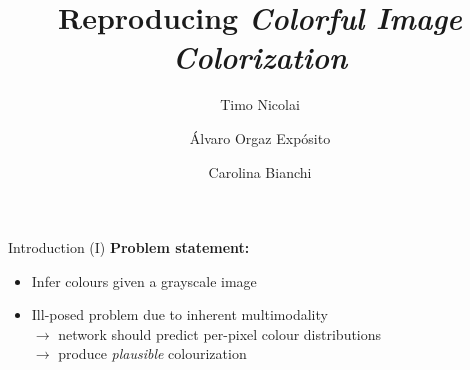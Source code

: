 \documentclass{beamer}
\title{Reproducing \textit{Colorful Image Colorization}}
\author{Timo Nicolai \and Álvaro Orgaz Expósito \and Carolina Bianchi}
\begin{document}
\begin{frame}
  \titlepage
\end{frame}


\begin{frame}{Introduction (I)}
  \textbf{Problem statement:}
    \begin{itemize}
      \item Infer colours given a grayscale image
      \item Ill-posed problem due to inherent multimodality \\
            $\rightarrow$ network should predict per-pixel colour distributions \\
            $\rightarrow$ produce \textit{plausible} colourization
    \end{itemize}

  \medskip


\end{frame}
\end{document}
